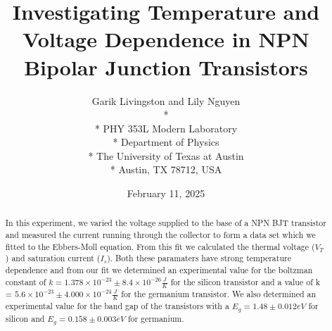 \documentclass[12pt,letterpaper,twocolumn]{article}
\begin{document}

\title{Investigating Temperature and Voltage Dependence in NPN Bipolar Junction Transistors}

\author{
 Garik Livingston and Lily Nguyen \\*
  \\*
 PHY 353L Modern Laboratory \\*
 Department of Physics \\*
 The University of Texas at Austin \\*
 Austin, TX 78712, USA
}
\date{February 11, 2025}


\maketitle


\begin{abstract}
	In this experiment, we varied the voltage supplied to the base of a NPN BJT transistor and measured the current running through the collector to form a data set which we fitted to the Ebbers-Moll equation.
	From this fit we calculated the thermal voltage ($V_T$) and saturation current ($I_s$). Both these paramaters have strong temperature dependence and from our fit we determined an experimental value for the boltzman constant of $k = 1.378 \times 10^{-23} \pm 8.4 \times 10^{-26} \frac{J}{K}$ for the silicon transistor and a value of k = $5.6 \times 10^{-23}\pm 4.000 \times 10^{-24} \frac{J}{K}$ for the germanium transistor. 
	We also determined an experimental value for the band gap of the transistors with a $E_g = 1.48 \pm 0.012eV$ for silicon and  $E_g = 0.158 \pm 0.003 eV$ for germanium.
	
\end{abstract}

\end{document}
